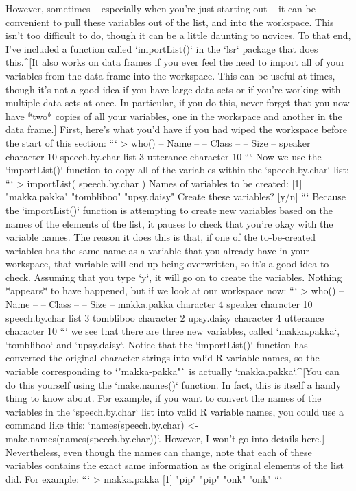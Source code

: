 However, sometimes -- especially when you're just starting out -- it can be convenient to pull these variables out of the list, and into the workspace. This isn't too difficult to do, though it can be a little daunting to novices. To that end, I've included a function called `importList()` in the `lsr` package that does this.^[It also works on data frames if you ever feel the need to import all of your variables from the data frame into the workspace. This can be useful at times, though it's not a good idea if you have large data sets or if you're working with multiple data sets at once. In particular, if you do this, never forget that you now have *two* copies of all your variables, one in the workspace and another in the data frame.] First, here's what you'd have if you had wiped the workspace before the start of this section:
```
> who()
   -- Name --       -- Class --   -- Size --
   speaker          character     10        
   speech.by.char   list           3        
   utterance        character     10     
```
Now we use the `importList()` function to copy all of the variables within the `speech.by.char` list:
```
> importList( speech.by.char )
Names of variables to be created:
[1] "makka.pakka" "tombliboo"   "upsy.daisy" 
Create these variables? [y/n] 
```
Because the `importList()` function is attempting to create new variables based on the names of the elements of the list, it pauses to check that you're okay with the variable names. The reason it does this is that, if one of the to-be-created variables has the same name as a variable that you already have in your workspace, that variable will end up being overwritten, so it's a good idea to check. Assuming that you type `y`, it will go on to create the variables. Nothing *appears* to have happened, but if we look at our workspace now:
```
> who()
   -- Name --       -- Class --   -- Size --
   makka.pakka      character      4        
   speaker          character     10        
   speech.by.char   list           3        
   tombliboo        character      2        
   upsy.daisy       character      4        
   utterance        character     10 
```
we see that there are three new variables, called `makka.pakka`, `tombliboo` and `upsy.daisy`. Notice that the `importList()` function has converted the original character strings into valid R variable names, so the variable corresponding to `"makka-pakka"` is actually `makka.pakka`.^[You can do this yourself using the `make.names()` function. In fact, this is itself a handy thing to know about. For example, if you want to convert the names of the variables in the `speech.by.char` list into valid R variable names, you could use a command like this: `names(speech.by.char) <- make.names(names(speech.by.char))`. However, I won't go into details here.] Nevertheless, even though the names can change, note that each of these variables contains the exact same information as the original elements of the list did. For example:
```
> makka.pakka
[1] "pip" "pip" "onk" "onk"
```


